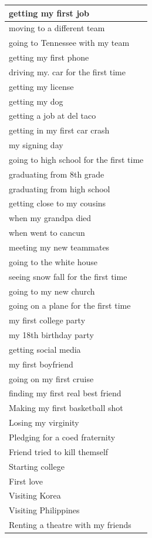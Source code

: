 \documentclass[
  .7em,
  letterpaper,
  DIV=11,
  numbers=noendperiod]{scrartcl}
\begin{document}
\begin{table}
\begin{tabular}{l}
\hline
getting my first job\\
\hline
moving to a different team\\
\hline
going to Tennessee with my team\\
\hline
getting my first phone\\
\hline
driving my. car for the first time\\
\hline
getting my license\\
\hline
getting my dog\\
\hline
getting a job at del taco\\
\hline
getting in my first car crash\\
\hline
my signing day\\
\hline
going to high school for the first time\\
\hline
graduating from 8th grade\\
\hline
graduating from high school\\
\hline
getting close to my cousins\\
\hline
when my grandpa died\\
\hline
when went to cancun\\
\hline
meeting my new teammates\\
\hline
going to the white house\\
\hline
seeing snow fall for the first time\\
\hline
going to my new church\\
\hline
going on a plane for the first time\\
\hline
my first college party\\
\hline
my 18th birthday party\\
\hline
getting social media\\
\hline
my first boyfriend\\
\hline
going on my first cruise\\
\hline
finding my first real best friend\\
\hline
Making my first basketball shot\\
\hline
Losing my virginity\\
\hline
Pledging for a coed fraternity\\
\hline
Friend tried to kill themself\\
\hline
Starting college\\
\hline
First love\\
\hline
Visiting Korea\\
\hline
Visiting Philippines\\
\hline
Renting a theatre with my friends\\

\end{tabular}
\end{table}
\end{document}
